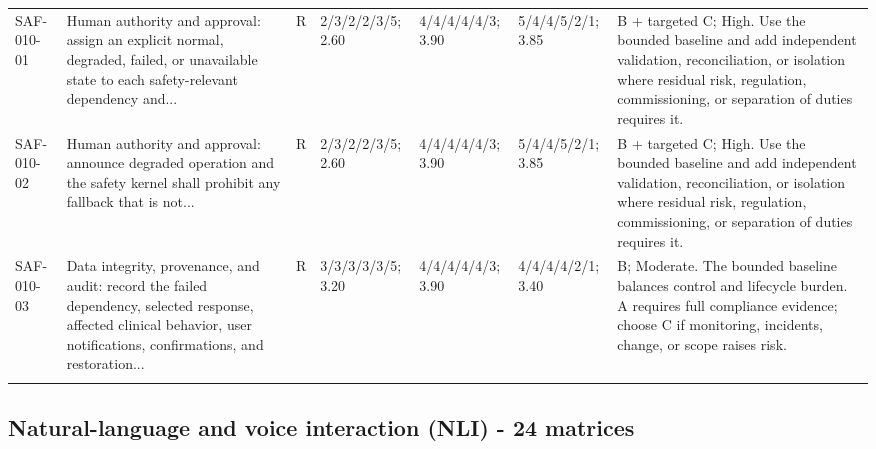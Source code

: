 \documentclass[11pt,letterpaper]{article}
\begin{document}
\begin{scriptsize}
\begin{longtable}{@{}L{0.11\textwidth}L{0.165\textwidth}L{0.04\textwidth}L{0.115\textwidth}L{0.115\textwidth}L{0.115\textwidth}L{0.235\textwidth}@{}}
\addlinespace[2pt]
SAF-010-01 & Human authority and approval: assign an explicit normal, degraded, failed, or unavailable state to each safety-relevant dependency and... & R & 2/3/2/2/3/5; 2.60 & 4/4/4/4/4/3; 3.90 & 5/4/4/5/2/1; 3.85 & B + targeted C; High. Use the bounded baseline and add independent validation, reconciliation, or isolation where residual risk, regulation, commissioning, or separation of duties requires it. \\
\addlinespace[2pt]
SAF-010-02 & Human authority and approval: announce degraded operation and the safety kernel shall prohibit any fallback that is not... & R & 2/3/2/2/3/5; 2.60 & 4/4/4/4/4/3; 3.90 & 5/4/4/5/2/1; 3.85 & B + targeted C; High. Use the bounded baseline and add independent validation, reconciliation, or isolation where residual risk, regulation, commissioning, or separation of duties requires it. \\
\addlinespace[2pt]
SAF-010-03 & Data integrity, provenance, and audit: record the failed dependency, selected response, affected clinical behavior, user notifications, confirmations, and restoration... & R & 3/3/3/3/3/5; 3.20 & 4/4/4/4/4/3; 3.90 & 4/4/4/4/2/1; 3.40 & B; Moderate. The bounded baseline balances control and lifecycle burden. A requires full compliance evidence; choose C if monitoring, incidents, change, or scope raises risk. \\
\addlinespace[2pt]
\end{longtable}
\end{scriptsize}

\subsection{Natural-language and voice interaction (NLI) - 24 matrices}
\end{document}
